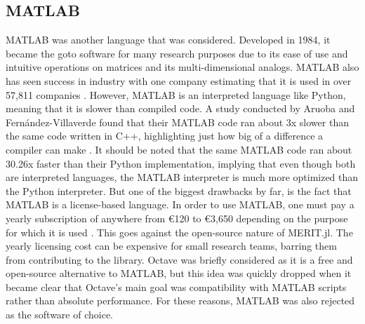 \subsection{MATLAB}
MATLAB was another language that was considered. Developed in 1984, it became the goto software for many research
purposes due to its ease of use and intuitive operations on matrices and its multi-dimensional analogs. MATLAB also has
seen success in industry with one company estimating that it is used in over 57,811 companies
\cite{CompaniesUsingMATLAB}. However, MATLAB is an interpreted language like Python, meaning that it is slower than
compiled code. A study conducted by Aruoba and Fernández-Villaverde found that their MATLAB code ran about 3x slower
than the same code written in C++, highlighting just how big of a difference a compiler can make
\cite{aruobaComparisonProgrammingLanguages2018}. It should be noted that the same MATLAB code ran about 30.26x faster
than their Python implementation, implying that even though both are interpreted languages, the MATLAB interpreter is
much more optimized than the Python interpreter. But one of the biggest drawbacks by far, is the fact that MATLAB is a
license-based language. In order to use MATLAB, one must pay a yearly subscription of anywhere from €120 to €3,650
depending on the purpose for which it is used \cite{MATLABPricing}. This goes against the open-source nature of
MERIT.jl. The yearly licensing cost can be expensive for small research teams, barring them from contributing to the
library. Octave was briefly considered as it is a free and open-source alternative to MATLAB, but this idea was quickly
dropped when it became clear that Octave's main goal was compatibility with MATLAB scripts rather than absolute
performance. For these reasons, MATLAB was also rejected as the software of choice.

